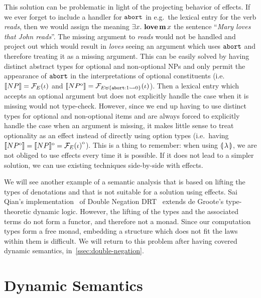 This solution can be problematic in light of the projecting behavior of
effects. If we ever forget to include a handler for $\mathtt{abort}$ in e.g.\
the lexical entry for the verb \emph{reads}, then we would assign the
meaning $\exists x.\ \textbf{love}\,\textbf{m}\,x$ the sentence
``\emph{Mary loves that John reads}''. The missing argument to \emph{reads}
would not be handled and project out which would result in \emph{loves}
seeing an argument which uses $\mathtt{abort}$ and therefore treating it as a
missing argument. This can be easily solved by having distinct abstract
types for optional and non-optional NPs and only permit the appearance of
$\mathtt{abort}$ in the interpretations of optional constituents (i.e.\
$\llbracket NP \rrbracket = \mathcal{F}_E(\iota)$ and
$\llbracket NP^{\mathrm{o}} \rrbracket = \mathcal{F}_{E \uplus \{\mathtt{abort} : 1 \rightarrowtail 0\}}(\iota)$). Then
a lexical entry which accepts an optional argument but does not explicitly
handle the case when it is missing would not type-check. However, since we
end up having to use distinct types for optional and non-optional items and
are always forced to explicitly handle the case when an argument is
missing, it makes little sense to treat optionality as an effect instead of
directly using option types (i.e.\ having
$\llbracket NP^{\mathrm{o}} \rrbracket = \llbracket NP \rrbracket^{\mathrm{o}} = {\mathcal{F}_E(\iota)}^{\mathrm{o}}$). This is a
thing to remember: when using $\llparenthesis \, \lambda \, \rrparenthesis$, we are not obliged to use
effects every time it is possible. If it does not lead to a simpler
solution, we can use existing techniques side-by-side with effects.

We will see another example of a semantic analysis that is based on lifting
the types of denotations and that is not suitable for a solution using
effects. Sai Qian's implementation~\cite{qian2014accessibility} of Double
Negation DRT~\cite{krahmer1995negation} extends de Groote's type-theoretic
dynamic logic. However, the lifting of the types and the associated terms
do not form a functor, and therefore not a monad. Since our computation
types form a free monad, embedding a structure which does not fit the laws
within them is difficult. We will return to this problem after having
covered dynamic semantics, in~\ref{ssec:double-negation}.


\section{Dynamic Semantics}
\label{sec:dynamic-semantics}

